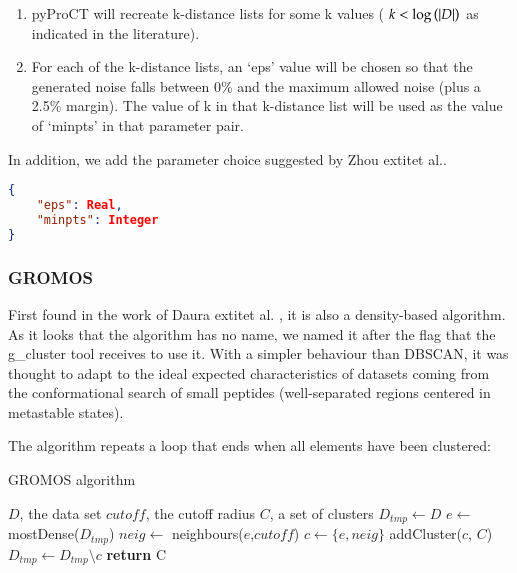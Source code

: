 \begin{enumerate}
\item pyProCT will recreate k-distance lists for some k values ( 
$ k < \log \left ( \lvert D\rvert \right )$ 
as indicated in the literature). 

\item For each of the k-distance lists, an `eps' value will be chosen so
that the generated noise falls between 0\% and the maximum allowed
noise (plus a 2.5\% margin). The value of k in that k-distance list
will be used as the value of `minpts' in that parameter pair. 
\end{enumerate}

In addition, we add the parameter choice suggested by Zhou 	extit{et al.}\cite{zhou_research_2012-1}.


\begin{lstlisting}[language=json,firstnumber=1] 
{ 	
	"eps": Real,
	"minpts": Integer 
}
\end{lstlisting}


\subsubsection{GROMOS}

First found in the work of Daura 	extit{et al.} \cite{daura_peptide_1999,daura_folding-unfolding_1999-1},
it is also a density-based algorithm. As it looks that the algorithm
has no name, we named it after the flag that the g\_cluster tool\cite{berendsen_gromacs_1995}
receives to use it. With a simpler behaviour than DBSCAN, it was thought
to adapt to the ideal expected characteristics of datasets coming
from the conformational search of small peptides (well-separated regions
centered in metastable states). 

The algorithm repeats a loop that ends when all elements have been
clustered:

\begin{algorithm}[H]
\caption{GROMOS algorithm}
\begin{algorithmic}[1]
\Input $D$, the data set
\Input $cutoff$, the cutoff radius
\Output $C$, a set of clusters
\State $D_{tmp} \gets D$ \;
\State $e \gets$ mostDense($D_{tmp}$)\;
\State $neig \gets$ neighbours($e$,$cutoff$)\;
\State $c \gets \{e, neig\}$\;
\State addCluster($c$, $C$)\;
\State $D_{tmp} \gets D_{tmp} \setminus c$\;
\EndWhile
\State \textbf{return} C
\end{algorithmic}
\end{algorithm}

